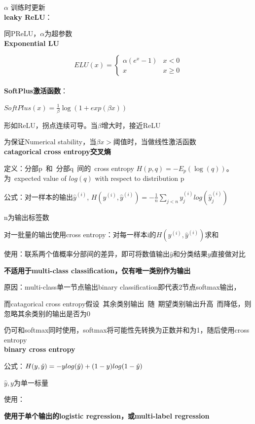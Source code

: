 \documentclass[UTF8]{ctexart}
\begin{document}
  $\alpha$ 训练时更新\\
\textbf{leaky ReLU}：

  同PReLU，$\alpha$为超参数\\
\textbf{Exponential LU}

  \begin{equation*}
    ELU(x) = \begin{cases}
      \alpha (e^x - 1) & x < 0\\
      x & x \geq 0
    \end{cases}
  \end{equation*}\\
\textbf{SoftPlus激活函数}：

  $SoftPlus(x) = \frac{1}{\beta} \log(1 + exp(\beta x))$

  形如ReLU，拐点连续可导。当$\beta$增大时，接近ReLU

  为保证Numerical stability，当$\beta x > $阈值时，当做线性激活函数\\
\textbf{catagorical cross entropy交叉熵}

  定义：分部p\ 和\ 分部q\ 间的\ cross entropy $H(p, q) = -E_p(\log (q))$。为\ expected value of $log (q)$ with respect to distribution p

  公式：对一样本的输出$\hat{y}^{(i)}$, $H(y^{(i)}, \hat{y}^{(i)}) = -\frac{1}{n}\sum_{j < n}y^{(i)}_jlog(\hat{y}^{(i)}_j)$

  \quad n为输出标签数

  \quad 对一批量的输出使用cross entropy：对每一样本i的$H(y^{(i)}, \hat{y}^{(i)})$求和

  使用：联系两个值概率分部间的差异，即可将数值输出$\hat{y}$和分类结果$y$直接做对比

  \quad \textbf{不适用于multi-class classification，仅有唯一类别作为输出}

  \quad \quad 原因：multi-class单一节点输出binary classification即代表2节点softmax输出，
  
  \quad \quad 而catagorical cross entropy假设\ 其余类别输出\ 随\ 期望类别输出升高\ 而降低，则忽略其余类别的输出是否为0

  \quad 仍可和softmax同时使用，softmax将可能性先转换为正数并和为1，随后使用cross entropy\\
\textbf{binary cross entropy}

  公式：$H(y, \hat{y}) = -y \space log(\hat{y}) + (1 - y)log(1 - \hat{y})$

  \quad $\hat{y}, y$为单一标量
  
  使用：
  
  \quad \textbf{使用于单个输出的logistic regression，或multi-label regression}
\end{document}
